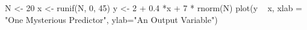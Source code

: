 \begin{Schunk}
\begin{Sinput}
 N <- 20
 x <- runif(N, 0, 45)
 y <- 2 + 0.4 *x + 7 * rnorm(N)
 plot(y ~ x, xlab = "One Mysterious Predictor", ylab="An Output Variable")
\end{Sinput}
\end{Schunk}
